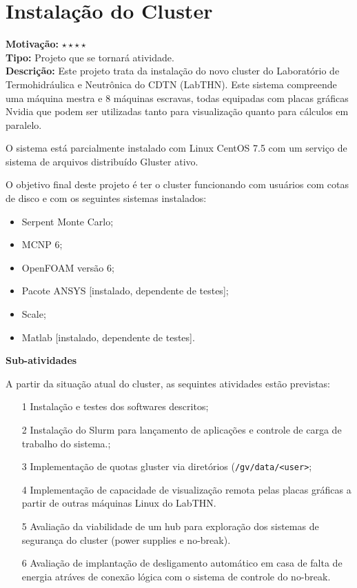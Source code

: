 \chapter{Instalação do Cluster}

\textbf{Motivação:} $\star\star\star\star$\\

\textbf{Tipo:} Projeto que se tornará atividade.\\

\textbf{Descrição:} Este projeto trata da instalação do novo cluster do Laboratório 
de Termohidráulica e Neutrônica do CDTN (LabTHN). Este sistema compreende uma máquina 
mestra e 8 máquinas escravas, todas equipadas com placas gráficas Nvidia que podem 
ser utilizadas tanto para visualização quanto para cálculos em paralelo.

O sistema está parcialmente instalado com Linux CentOS 7.5 com um serviço de 
sistema de arquivos distribuído Gluster ativo. 

O objetivo final deste projeto é ter o cluster funcionando com usuários com cotas 
de disco e com os seguintes sistemas instalados:

\begin{itemize}
	\item Serpent Monte Carlo;
	\item MCNP 6;
	\item OpenFOAM versão 6;
	\item Pacote ANSYS [instalado, dependente de testes];
	\item Scale;
	\item Matlab [instalado, dependente de testes].
\end{itemize}

\textbf{Sub-atividades}

A partir da situação atual do cluster, as sequintes atividades estão previstas:
\begin{itemize}
	\item[1] Instalação e testes dos softwares descritos;
	\item[2] Instalação do Slurm para lançamento de aplicações e controle de 
	carga de trabalho do sistema.;
	\item[3] Implementação de quotas gluster via diretórios (\texttt{/gv/data/<user>};
	\item[4] Implementação de capacidade de visualização remota pelas placas gráficas a partir de outras máquinas Linux do LabTHN.
	\item[5] Avaliação da viabilidade de um hub para exploração dos sistemas de segurança do cluster (power supplies e no-break).
	\item[6] Avaliação de implantação de desligamento automático em casa de falta de energia atráves de conexão lógica com o sistema de controle do no-break.
\end{itemize}

